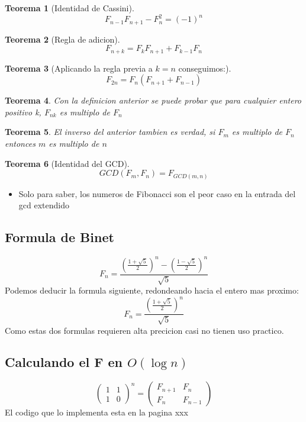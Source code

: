 \documentclass[12pt]{article}
\newtheorem{theorem}{Teorema}[section]
\begin{document}
    \begin{theorem}[Identidad de Cassini]
        \[F_{n-1}F_{n+1} - F_n^2 = (-1)^n\]
    \end{theorem}
    \begin{theorem}[Regla de adicion]
        \[F_{n+k} = F_kF_{n+1} + F_{k-1}F_n\]
    \end{theorem}
    \begin{theorem}[Aplicando la regla previa a \(k = n\) conseguimos:]
        \[F_{2n} = F_n(F_{n+1} + F_{n-1})\]
    \end{theorem}
    \begin{theorem}
        Con la definicion anterior se puede probar que para cualquier entero positivo k, \(F_{nk}\) es multiplo de \(F_n\)
    \end{theorem}
    \begin{theorem}
        El inverso del anterior tambien es verdad, si \(F_m\) es multiplo de \(F_n\) entonces \(m\) es multiplo de \(n\)
    \end{theorem}
    \begin{theorem}[Identidad del GCD]
        \[GCD(F_m, F_n) = F_{GCD(m, n)}\]
    \end{theorem}
    \begin{itemize}
        \item Solo para saber, los numeros de Fibonacci son el peor caso en la entrada del gcd extendido
    \end{itemize}
    \subsection{Formula de Binet}
        \[F_n = \frac{(\frac{1 + \sqrt{5}}{2})^n - (\frac{1 - \sqrt{5}}{2})^n}{\sqrt{5}}\]
    Podemos deducir la formula siguiente, redondeando hacia el entero mas proximo:
        \[F_n = \frac{(\frac{1 + \sqrt{5}}{2})^n}{\sqrt{5}}\]
    Como estas dos formulas requieren alta precicion casi no tienen uso practico.
    \subsection{Calculando el F en \(O(\log n)\)}
        \[
    \begin{pmatrix} 
        1 & 1 \\ 
        1 & 0 
    \end{pmatrix}^n =
    \begin{pmatrix} 
        F_{n+1} & F_{n} \\ 
        F_{n} & F_{n-1} 
    \end{pmatrix}
    \]
    El codigo que lo implementa esta en la pagina xxx
    
\end{document}

